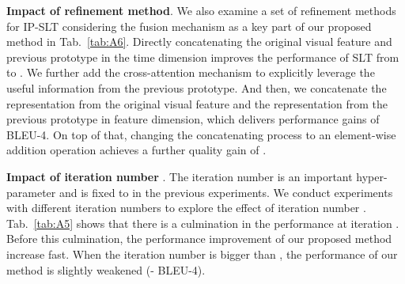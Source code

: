 \documentclass[10pt,twocolumn,letterpaper]{article}
\begin{document}
     

    \smallskip
    \noindent \textbf{Impact of refinement method}.
    We also examine a set of refinement methods for IP-SLT considering the fusion mechanism as a key part of our proposed method in Tab.~\ref{tab:A6}. Directly concatenating the original visual feature and previous prototype in the time dimension improves the performance of SLT from  to . 
    We further add the cross-attention mechanism to explicitly leverage the useful information from the previous prototype. And then, we concatenate the representation from the original visual feature and the representation from the previous prototype in feature dimension, which delivers performance gains of  BLEU-4. On top of that, changing the concatenating process to an element-wise addition operation achieves a further quality gain of . 

    \smallskip
    \noindent \textbf{Impact of iteration number }.
    The iteration number  is an important hyper-parameter and is fixed to  in the previous experiments. We conduct experiments with different iteration numbers to explore the effect of iteration number . Tab.~\ref{tab:A5} shows that there is a culmination in the performance at iteration . Before this culmination, the performance improvement of our proposed method increase fast. When the iteration number is bigger than , the performance of our method is slightly weakened (- BLEU-4).

    

    \setlength{\tabcolsep}{5.5pt}
    \begin{table}[!t]
     \scriptsize
     \vspace{0.5mm}
     \caption{
     Effect of the iteration number  in the iterative refinement module.
     }
     \label{tab:A5}
     \vspace{-1mm}
     \end{table}
\end{document}

